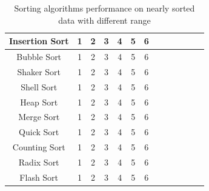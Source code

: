 \documentclass[11pt,a4paper]{article}
\begin{document}
{\begin{table}[H]
{\begin{tabular}{|c|c|c|c|c|c|c|c|c|c|c|c|c|}
		 \hline
		 Insertion Sort & 1 & 2 & 3 & 4 & 5 & 6\\
		 \hline
		 Bubble Sort 	& 1 & 2 & 3 & 4 & 5 & 6\\
		 \hline
		 Shaker Sort 	& 1 & 2 & 3 & 4 & 5 & 6\\
		 \hline
		 Shell Sort		& 1 & 2 & 3 & 4 & 5 & 6\\
		 \hline
		 Heap Sort		& 1 & 2 & 3 & 4 & 5 & 6\\
		 \hline
		 Merge Sort		& 1 & 2 & 3 & 4 & 5 & 6\\
		 \hline
		 Quick Sort		& 1 & 2 & 3 & 4 & 5 & 6\\
		 \hline
		 Counting Sort 	& 1 & 2 & 3 & 4 & 5 & 6\\
		 \hline
		 Radix Sort 	& 1 & 2 & 3 & 4 & 5 & 6\\
		 \hline
		 Flash Sort 	& 1 & 2 & 3 & 4 & 5 & 6\\
		 \hline
		\end{tabular}}
		\caption{Sorting algorithms performance on nearly sorted data with different range}
		\end{table}
		
}
\end{document}
